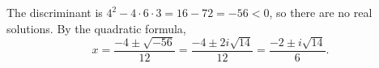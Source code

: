 The discriminant is $4^2-4\cdot6\cdot3=16-72=-56<0$, so there are no real solutions. By the quadratic formula,
\[x=\dfrac{-4\pm\sqrt{-56}}{12}=\dfrac{-4\pm2i\sqrt{14}}{12}=\boxed{\dfrac{-2\pm i\sqrt{14}}{6}}.\]
